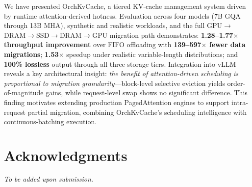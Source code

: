 \documentclass[conference]{IEEEtran}
\begin{document}
We have presented OrchKvCache, a tiered KV-cache management system driven by runtime attention-derived hotness. Evaluation across four models (7B GQA through 13B MHA), synthetic and realistic workloads, and the full GPU$\to$DRAM$\to$SSD$\to$DRAM$\to$GPU migration path demonstrates: \textbf{1.28--1.77$\times$ throughput improvement} over FIFO offloading with \textbf{139--597$\times$ fewer data migrations}; \textbf{1.53$\times$} speedup under realistic variable-length distributions; and \textbf{100\% lossless} output through all three storage tiers. Integration into vLLM reveals a key architectural insight: \emph{the benefit of attention-driven scheduling is proportional to migration granularity}---block-level selective eviction yields order-of-magnitude gains, while request-level swap shows no significant difference. This finding motivates extending production PagedAttention engines to support intra-request partial migration, combining OrchKvCache's scheduling intelligence with continuous-batching execution.

\section*{Acknowledgments}
\textit{To be added upon submission.}
\end{document}
